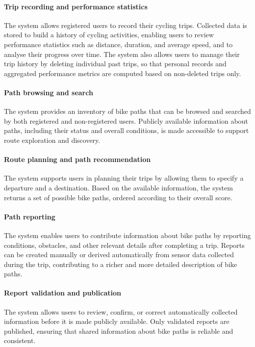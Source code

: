 \paragraph{Trip recording and performance statistics}
The system allows registered users to record their cycling trips. Collected data is stored to build a history of cycling activities, enabling users to review performance statistics such as distance, duration, and average speed, and to analyse their progress over time. The system also allows users to manage their trip history by deleting individual past trips, so that personal records and aggregated performance metrics are computed based on non-deleted trips only.

\paragraph{Path browsing and search}
The system provides an inventory of bike paths that can be browsed and searched by both registered and non-registered users. Publicly available information about paths, including their status and overall conditions, is made accessible to support route exploration and discovery.

\paragraph{Route planning and path recommendation}
The system supports users in planning their trips by allowing them to specify a departure and a destination. Based on the available information, the system returns a set of possible bike paths, ordered according to their overall score.

\paragraph{Path reporting}
The system enables users to contribute information about bike paths by reporting conditions, obstacles, and other relevant details after completing a trip. Reports can be created manually or derived automatically from sensor data collected during the trip, contributing to a richer and more detailed description of bike paths.

\paragraph{Report validation and publication}
The system allows users to review, confirm, or correct automatically collected information before it is made publicly available. Only validated reports are published, ensuring that shared information about bike paths is reliable and consistent.

